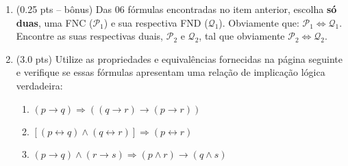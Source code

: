 \documentclass[12pt]{article}
\begin{document}
\begin{enumerate}
\item (0.25 pts -- b\^onus) Das 06 fórmulas
encontradas no item anterior, escolha \textbf{s\'o duas}, uma 
FNC ($\mathcal{P}_1$) e sua respectiva FND ($\mathcal{Q}_1$). Obviamente que: $\mathcal{P}_1 \Leftrightarrow \mathcal{Q}_1$. 
Encontre as suas respectivas duais, $\mathcal{P}_2$ e $\mathcal{Q}_2$,  tal que obviamente  $\mathcal{P}_2 \Leftrightarrow \mathcal{Q}_2$.


\item (3.0 pts) Utilize as propriedades e equivalências
fornecidas na página seguinte
e verifique  se essas fórmulas apresentam uma relaç\~ao de implicaç\~ao lógica  verdadeira:

\begin{enumerate}
\setlength{\itemsep}{-2pt}








\item $(p \rightarrow q)  \Rightarrow ((q \rightarrow r) \rightarrow (p \rightarrow r)) $

\item $[(p \leftrightarrow q) \wedge (q \leftrightarrow r)] \Rightarrow (p \leftrightarrow r)$


\item $(p \rightarrow q) \wedge (r \rightarrow s)  \Rightarrow (p \wedge r ) \rightarrow  (q \wedge s) $


\end{enumerate}
\end{enumerate}
\end{document}
